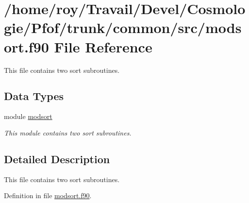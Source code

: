\hypertarget{common_2src_2modsort_8f90}{\section{/home/roy/\-Travail/\-Devel/\-Cosmologie/\-Pfof/trunk/common/src/modsort.f90 File Reference}
\label{common_2src_2modsort_8f90}
}


This file contains two sort subroutines.  


\subsection*{Data Types}
\begin{DoxyCompactItemize}
\item 
module \hyperlink{classmodsort}{modsort}
\begin{DoxyCompactList}\small\item\em This module contains two sort subroutines. \end{DoxyCompactList}\end{DoxyCompactItemize}


\subsection{Detailed Description}
This file contains two sort subroutines. 

Definition in file \hyperlink{common_2src_2modsort_8f90_source}{modsort.\-f90}.

